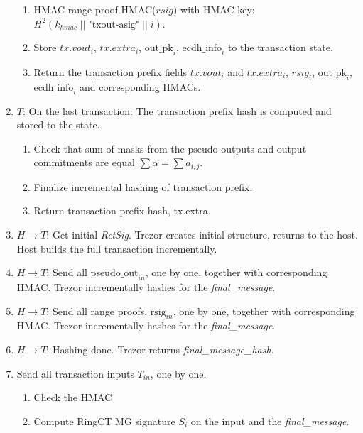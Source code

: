 \documentclass[]{article}
\begin{document}
\begin{enumerate}
\begin{enumerate}
        \item HMAC range proof HMAC($rsig$) with HMAC key: $H^2(k_{hmac} \; || \; \text{"txout-asig"} \; || \; i)$.
        
        \item Store $tx.vout_i$, $tx.extra_i$, $\text{out\_pk}_i$, $\text{ecdh\_info}_i$ to the transaction state.
        
		\item Return the transaction prefix fields $tx.vout_i$ and $tx.extra_i$, $rsig_i$, $\text{out\_pk}_i$, $\text{ecdh\_info}_i$ and corresponding HMACs.
		
	\end{enumerate}
	  
	\item $T$: On the last transaction: The transaction prefix hash is computed and stored to the state. 
	
	\begin{enumerate}
		\item Check that sum of masks from the pseudo-outputs and output commitments are equal $\sum \alpha = \sum a_{i,j}$.
		
		\item Finalize incremental hashing of transaction prefix.
		
		\item Return transaction prefix hash, tx.extra.
	\end{enumerate} 

	\item $H \rightarrow T$: Get initial \emph{RctSig}. Trezor creates initial structure, returns to the host. Host builds the full transaction incrementally.

	\item $H \rightarrow T$: Send all $\text{pseudo\_out}_{in}$, one by one, together with corresponding HMAC. Trezor incrementally hashes for the \emph{final\_message}. 
	
	\item $H \rightarrow T$: Send all range proofs, $\text{rsig}_{in}$, one by one, together with corresponding HMAC. Trezor incrementally hashes for the \emph{final\_message}. 
	
	\item $H \rightarrow T$: Hashing done. Trezor returns \emph{final\_message\_hash}.
	
	\item Send all transaction inputs $T_{in}$, one by one.
	\begin{enumerate}
		\item Check the HMAC
		
		\item Compute RingCT MG signature $S_i$ on the input and the \emph{final\_message}.
		
	\end{enumerate} 
	
\end{enumerate}
\end{document}
